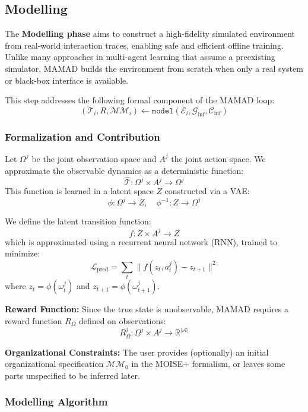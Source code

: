 \documentclass[pdflatex,sn-mathphys-num]{sn-jnl}%
\theoremstyle{thmstyleone}%
\theoremstyle{thmstyletwo}%
\theoremstyle{thmstylethree}%
\begin{document}
% 


\subsection{Modelling}\label{sec:modelling}

The \textbf{Modelling phase} aims to construct a high-fidelity simulated environment from real-world interaction traces, enabling safe and efficient offline training. Unlike many approaches in multi-agent learning that assume a preexisting simulator, MAMAD builds the environment from scratch when only a real system or black-box interface is available.

This step addresses the following formal component of the MAMAD loop:  
\[
(\mathcal{T}_i, R, \mathcal{MM}_i) \gets \texttt{model}(\mathcal{E}_i, \mathcal{G}_{\text{inf}}, \mathcal{C}_{\text{inf}})
\]

\subsubsection*{Formalization and Contribution}

Let $\Omega^j$ be the joint observation space and $A^j$ the joint action space. We approximate the observable dynamics as a deterministic function:
\[
\hat{\mathcal{T}}: \Omega^j \times A^j \rightarrow \Omega^j
\]
This function is learned in a latent space $Z$ constructed via a VAE:
\[
\phi: \Omega^j \rightarrow Z, \quad \phi^{-1}: Z \rightarrow \Omega^j
\]

We define the latent transition function:
\[
f: Z \times A^j \rightarrow Z
\]
which is approximated using a recurrent neural network (RNN), trained to minimize:
\[
\mathcal{L}_{\text{pred}} = \sum_{t} \| f(z_t, a^j_t) - z_{t+1} \|^2
\]
where $z_t = \phi(\omega^j_t)$ and $z_{t+1} = \phi(\omega^j_{t+1})$.

\textbf{Reward Function:} Since the true state is unobservable, MAMAD requires a reward function $R_\Omega$ defined on observations:
\[
R^j_\Omega: \Omega^j \times A^j \rightarrow \mathbb{R}^{|\mathcal{A}|}
\]

\textbf{Organizational Constraints:} The user provides (optionally) an initial organizational specification $\mathcal{MM}_0$ in the MOISE+ formalism, or leaves some parts unspecified to be inferred later.

\subsubsection*{Modelling Algorithm}
\end{document}

